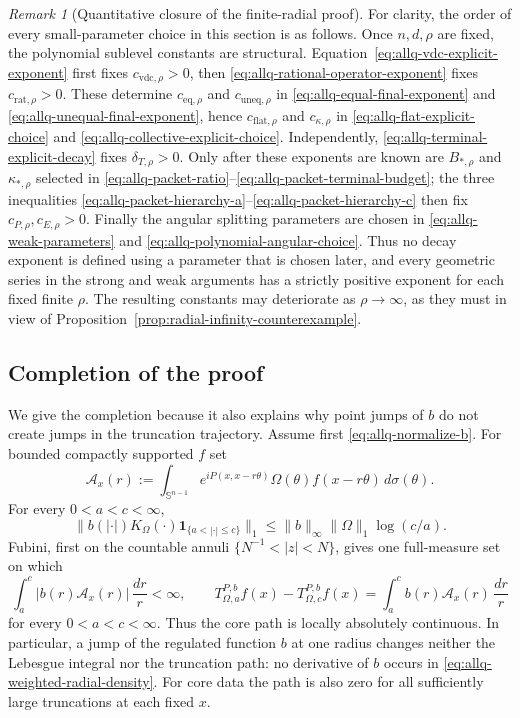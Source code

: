 \documentclass[11pt]{article}
\numberwithin{equation}{section}
\theoremstyle{remark}
\newtheorem{remark}[theorem]{Remark}
\theoremstyle{definition}
\newcommand{\Sph}{\mathbb S}
\begin{document}
\begin{remark}[Quantitative closure of the finite-radial proof]
\label{rem:allq-parameter-ledger}
For clarity, the order of every small-parameter choice in this section is
as follows.  Once $n,d,\rho$ are fixed, the polynomial sublevel constants
are structural.  Equation~\eqref{eq:allq-vdc-explicit-exponent} first fixes
$c_{\mathrm{vdc},\rho}>0$, then
\eqref{eq:allq-rational-operator-exponent} fixes
$c_{\mathrm{rat},\rho}>0$.  These determine
$c_{\mathrm{eq},\rho}$ and $c_{\mathrm{uneq},\rho}$ in
\eqref{eq:allq-equal-final-exponent} and
\eqref{eq:allq-unequal-final-exponent}, hence
$c_{\mathrm{flat},\rho}$ and $c_{\kappa,\rho}$ in
\eqref{eq:allq-flat-explicit-choice} and
\eqref{eq:allq-collective-explicit-choice}.  Independently,
\eqref{eq:allq-terminal-explicit-decay} fixes
$\delta_{T,\rho}>0$.  Only after these exponents are known are
$B_{*,\rho}$ and $\kappa_{*,\rho}$ selected in
\eqref{eq:allq-packet-ratio}--\eqref{eq:allq-packet-terminal-budget};
the three inequalities
\eqref{eq:allq-packet-hierarchy-a}--\eqref{eq:allq-packet-hierarchy-c}
then fix $c_{P,\rho},c_{E,\rho}>0$.  Finally the angular splitting
parameters are chosen in \eqref{eq:allq-weak-parameters} and
\eqref{eq:allq-polynomial-angular-choice}.  Thus no decay exponent is
defined using a parameter that is chosen later, and every geometric
series in the strong and weak arguments has a strictly positive exponent
for each fixed finite $\rho$.  The resulting constants may deteriorate
as $\rho\to\infty$, as they must in view of
Proposition~\ref{prop:radial-infinity-counterexample}.
\end{remark}

\subsection{Completion of the proof}

We give the completion because it also explains why point jumps of $b$
do not create jumps in the truncation trajectory.  Assume first
\eqref{eq:allq-normalize-b}.  For bounded compactly supported $f$ set
\[
 \mathcal A_x(r)
 :=\int_{\Sph^{n-1}}e^{iP(x,x-r\theta)}
       \Omega(\theta)f(x-r\theta)\,d\sigma(\theta).
\]
For every $0<a<c<\infty$,
\begin{equation}\label{eq:allq-completion-annulus-kernel}
 \|b(|\cdot|)K_\Omega(\cdot)
       \mathbf1_{\{a<|\cdot|\le c\}}\|_1
 \le \|b\|_\infty\|\Omega\|_1\log(c/a).
\end{equation}
Fubini, first on the countable annuli
$\{N^{-1}<|z|<N\}$, gives one full-measure set on which
\begin{equation}\label{eq:allq-weighted-radial-density}
 \int_a^c|b(r)\mathcal A_x(r)|\,\frac{dr}{r}<\infty,
 \qquad
 T^{P,b}_{\Omega,a}f(x)-T^{P,b}_{\Omega,c}f(x)
 =\int_a^c b(r)\mathcal A_x(r)\,\frac{dr}{r}
\end{equation}
for every $0<a<c<\infty$.  Thus the core path is locally absolutely
continuous.  In particular, a jump of the regulated function $b$ at one
radius changes neither the Lebesgue integral nor the truncation path: no
derivative of $b$ occurs in \eqref{eq:allq-weighted-radial-density}.
For core data the path is also zero for all sufficiently large
truncations at each fixed $x$.
\end{document}
